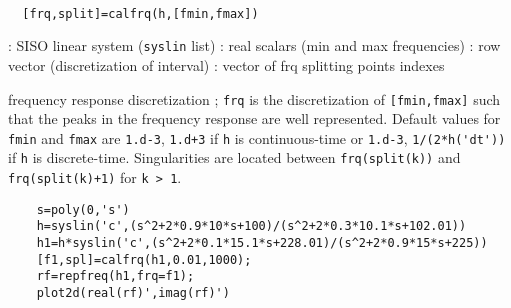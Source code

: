 \begin{mandesc}
   \\ %
\end{mandesc}
\begin{calling_sequence}
\begin{verbatim}
  [frq,split]=calfrq(h,[fmin,fmax])  
\end{verbatim}
\end{calling_sequence}
\begin{parameters}
  \begin{varlist}
    : SISO linear system (\verb!syslin! list)
    : real scalars (min and max frequencies)
    : row vector (discretization of interval)
    : vector of frq splitting points indexes
  \end{varlist}
\end{parameters}
\begin{mandescription}

  frequency response discretization ; \verb!frq! is the discretization of
  \verb![fmin,fmax]!  such that the peaks in the frequency response are well
  represented.  Default values for \verb!fmin! and \verb!fmax! are \verb!1.d-3!,
  \verb!1.d+3! if \verb!h! is continuous-time or \verb!1.d-3!,
  \verb!1/(2*h('dt'))! if \verb!h! is discrete-time.  Singularities are located
  between \verb!frq(split(k))! and \verb!frq(split(k)+1)!  for \verb!k > 1!.

\end{mandescription}
\begin{examples}
  \begin{Verbatim}
    s=poly(0,'s')
    h=syslin('c',(s^2+2*0.9*10*s+100)/(s^2+2*0.3*10.1*s+102.01))
    h1=h*syslin('c',(s^2+2*0.1*15.1*s+228.01)/(s^2+2*0.9*15*s+225)) 
    [f1,spl]=calfrq(h1,0.01,1000);
    rf=repfreq(h1,frq=f1);
    plot2d(real(rf)',imag(rf)')
  \end{Verbatim}
\end{examples}
\begin{manseealso}
         
\end{manseealso}
